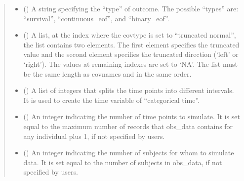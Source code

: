 \documentclass[letterpaper,10pt,english]{sphinxmanual}
\begin{document}
\begin{fulllineitems}
\begin{quote}
\begin{description}
\begin{itemize}
\item {} 
\sphinxAtStartPar
{} (\sphinxstyleliteralemphasis{\sphinxupquote{, }}) \textendash{} A string specifying the “type” of outcome. The possible “types” are: “survival”, “continuous\_eof”, and “binary\_eof”.

\item {} 
\sphinxAtStartPar
{} (\sphinxstyleliteralemphasis{\sphinxupquote{, }}) \textendash{} A list, at the index where the covtype is set to “truncated normal”, the list contains two elements.
The first element specifies the truncated value and the second element specifies the truncated direction
(‘left’ or ‘right’). The values at remaining indexes are set to ‘NA’. The list must be the same length as
covnames and in the same order.

\item {} 
\sphinxAtStartPar
{} (\sphinxstyleliteralemphasis{\sphinxupquote{, }}) \textendash{} A list of integers that splits the time points into different intervals. It is used to create the time variable
of “categorical time”.

\item {} 
\sphinxAtStartPar
{} (\sphinxstyleliteralemphasis{\sphinxupquote{, }}) \textendash{} An integer indicating the number of time points to simulate. It is set equal to the maximum number of records
that obs\_data contains for any individual plus 1, if not specified by users.

\item {} 
\sphinxAtStartPar
{} (\sphinxstyleliteralemphasis{\sphinxupquote{, }}) \textendash{} An integer indicating the number of subjects for whom to simulate data. It is set equal to the number of
subjects in obs\_data, if not specified by users.


\end{itemize}
\end{description}
\end{quote}
\end{fulllineitems}
\end{document}
